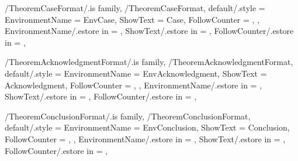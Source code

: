 
\pgfkeys
{
  /TheoremCaseFormat/.is family, /TheoremCaseFormat,
  default/.style =
  {
    EnvironmentName = {EnvCase},
    ShowText = {Case},
    FollowCounter = \empty,
  },
  EnvironmentName/.estore in = \GetTheoremCaseFormatEnvironmentName,
  ShowText/.estore in = \GetTheoremCaseFormatShowText,
  FollowCounter/.estore in = \GetTheoremCaseFormatFollowCounter,
} %

\newcommand{\InsertCase}[1]
{%
  \InsertTheoremContent[\empty]{%
    \GetTheoremCaseFormatEnvironmentName}{#1}%
} %

\newcommand{\InitTheoremCaseFormat}
{%
  \ifthenelse{\equal{\GetTheoremCaseFormatFollowCounter}{\empty}}%
  {%
    \newtheorem*{%
      \GetTheoremCaseFormatEnvironmentName}{%
      \GetTheoremCaseFormatShowText}
  }%
  {%
    \newtheorem{%
      \GetTheoremCaseFormatEnvironmentName}{%
      \GetTheoremCaseFormatShowText}[%
      \GetTheoremCaseFormatFollowCounter]%
  }%
} %


\pgfkeys
{
  /TheoremAcknowledgmentFormat/.is family, /TheoremAcknowledgmentFormat,
  default/.style =
  {
    EnvironmentName = {EnvAcknowledgment},
    ShowText = {Acknowledgment},
    FollowCounter = \empty,
  },
  EnvironmentName/.estore in = \GetTheoremAcknowledgmentFormatEnvironmentName,
  ShowText/.estore in = \GetTheoremAcknowledgmentFormatShowText,
  FollowCounter/.estore in = \GetTheoremAcknowledgmentFormatFollowCounter,
} %

\newcommand{\InsertAcknowledgment}[1]
{%
  \InsertTheoremContent[\empty]{%
    \GetTheoremAcknowledgmentFormatEnvironmentName}{#1}%
} %

\newcommand{\InitTheoremAcknowledgmentFormat}
{%
  \ifthenelse{\equal{\GetTheoremAcknowledgmentFormatFollowCounter}{\empty}}%
  {%
    \newtheorem*{%
      \GetTheoremAcknowledgmentFormatEnvironmentName}{%
      \GetTheoremAcknowledgmentFormatShowText}
  }%
  {%
    \newtheorem{%
      \GetTheoremAcknowledgmentFormatEnvironmentName}{%
      \GetTheoremAcknowledgmentFormatShowText}[%
      \GetTheoremAcknowledgmentFormatFollowCounter]%
  }%
} %


\pgfkeys
{
  /TheoremConclusionFormat/.is family, /TheoremConclusionFormat,
  default/.style =
  {
    EnvironmentName = {EnvConclusion},
    ShowText = {Conclusion},
    FollowCounter = \empty,
  },
  EnvironmentName/.estore in = \GetTheoremConclusionFormatEnvironmentName,
  ShowText/.estore in = \GetTheoremConclusionFormatShowText,
  FollowCounter/.estore in = \GetTheoremConclusionFormatFollowCounter,
} %

